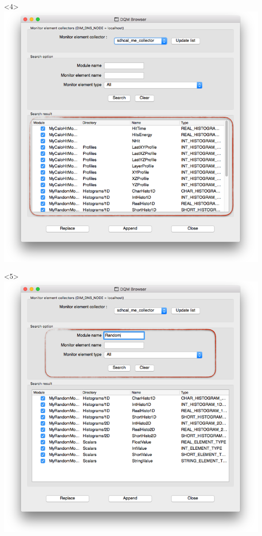 \documentclass[8pt]{beamer}
\begin{document}
\begin{frame}
\begin{overlayarea}{\textwidth}{\textheight}
\begin{columns}
\begin{center}
         \begin{onlyenv}<4>\includegraphics[width=1.1\textwidth]{figs/Browser/Browser_FullList}\end{onlyenv}
         \begin{onlyenv}<5>\includegraphics[width=1.1\textwidth]{figs/Browser/Browser_Search}\end{onlyenv}

\end{center}
\end{columns}
\end{overlayarea}
\end{frame}
\end{document}
